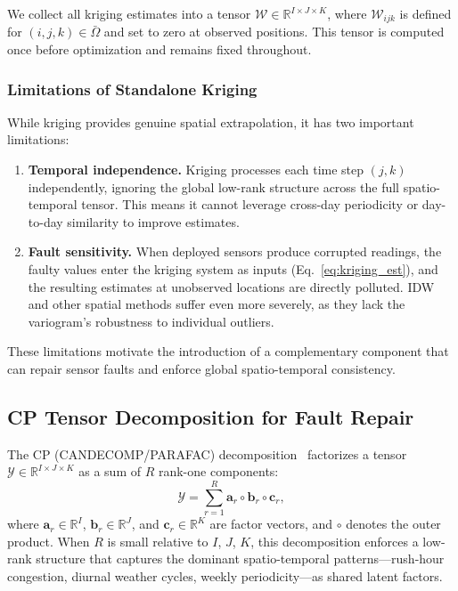 \documentclass[journal]{IEEEtran}
\newcommand{\Ycal}{\mathcal{Y}}
\newcommand{\Wcal}{\mathcal{W}}
\newcommand{\Omegamis}{\bar{\Omega}}
\begin{document}
We collect all kriging estimates into a tensor $\Wcal \in \mathbb{R}^{I \times J \times K}$, where $\Wcal_{ijk}$ is defined for $(i,j,k) \in \Omegamis$ and set to zero at observed positions. This tensor is computed once before optimization and remains fixed throughout.

\subsubsection{Limitations of Standalone Kriging}\label{sec:kriging_limit}

While kriging provides genuine spatial extrapolation, it has two important limitations:
\begin{enumerate}
\item \textbf{Temporal independence.} Kriging processes each time step $(j,k)$ independently, ignoring the global low-rank structure across the full spatio-temporal tensor. This means it cannot leverage cross-day periodicity or day-to-day similarity to improve estimates.
\item \textbf{Fault sensitivity.} When deployed sensors produce corrupted readings, the faulty values enter the kriging system as inputs (Eq.~\eqref{eq:kriging_est}), and the resulting estimates at unobserved locations are directly polluted. IDW and other spatial methods suffer even more severely, as they lack the variogram's robustness to individual outliers.
\end{enumerate}
These limitations motivate the introduction of a complementary component that can repair sensor faults and enforce global spatio-temporal consistency.

\subsection{CP Tensor Decomposition for Fault Repair}\label{sec:cp_block}

The CP (CANDECOMP/PARAFAC) decomposition~\cite{carroll1970analysis,harshman1970foundations} factorizes a tensor $\Ycal \in \mathbb{R}^{I \times J \times K}$ as a sum of $R$ rank-one components:
\begin{equation}\label{eq:cp}
\Ycal = \sum_{r=1}^{R} \mathbf{a}_{r} \circ \mathbf{b}_{r} \circ \mathbf{c}_{r},
\end{equation}
where $\mathbf{a}_{r} \in \mathbb{R}^{I}$, $\mathbf{b}_{r} \in \mathbb{R}^{J}$, and $\mathbf{c}_{r} \in \mathbb{R}^{K}$ are factor vectors, and $\circ$ denotes the outer product. When $R$ is small relative to $I$, $J$, $K$, this decomposition enforces a low-rank structure that captures the dominant spatio-temporal patterns---rush-hour congestion, diurnal weather cycles, weekly periodicity---as shared latent factors.
\end{document}
